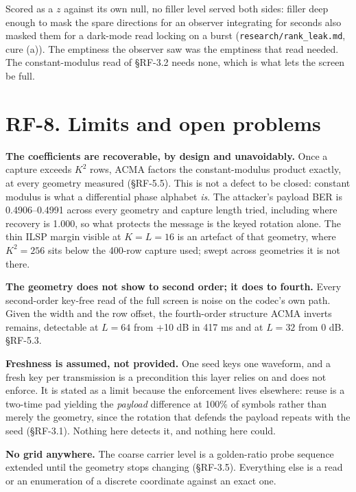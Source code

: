 \documentclass[10pt,letterpaper,twocolumn]{article}
\begin{document}
Scored as a \(z\) against its own null, no filler level served both sides: filler deep enough to mask the spare directions for an observer integrating for seconds also masked them for a dark-mode read locking on a burst (\texttt{research/\allowbreak{}rank\_\allowbreak{}leak.\allowbreak{}md}, cure (a)). The emptiness the observer saw was the emptiness that read needed. The constant-modulus read of §RF-3.2 needs none, which is what lets the screen be full.

\section{RF-8. Limits and open problems}\label{rf-8-limits-and-open-problems}

\textbf{The coefficients are recoverable, by design and unavoidably.} Once a capture exceeds \(K^2\) rows, ACMA factors the constant-modulus product exactly, at every geometry measured (§RF-5.5). This is not a defect to be closed: constant modulus is what a differential phase alphabet \emph{is}. The attacker's payload BER is 0.4906--0.4991 across every geometry and capture length tried, including where recovery is 1.000, so what protects the message is the keyed rotation alone. The thin ILSP margin visible at \(K = L = 16\) is an artefact of that geometry, where \(K^2 = 256\) sits below the 400-row capture used; swept across geometries it is not there.

\textbf{The geometry does not show to second order; it does to fourth.} Every second-order key-free read of the full screen is noise on the codec's own path. Given the width and the row offset, the fourth-order structure ACMA inverts remains, detectable at \(L = 64\) from +10 dB in 417 ms and at \(L = 32\) from 0 dB. §RF-5.3.

\textbf{Freshness is assumed, not provided.} One seed keys one waveform, and a fresh key per transmission is a precondition this layer relies on and does not enforce. It is stated as a limit because the enforcement lives elsewhere: reuse is a two-time pad yielding the \emph{payload} difference at 100\% of symbols rather than merely the geometry, since the rotation that defends the payload repeats with the seed (§RF-3.1). Nothing here detects it, and nothing here could.

\textbf{No grid anywhere.} The coarse carrier level is a golden-ratio probe sequence extended until the geometry stops changing (§RF-3.5). Everything else is a read or an enumeration of a discrete coordinate against an exact one.
\end{document}
